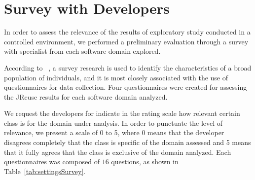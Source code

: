 \section{Survey with Developers}

In order to assess the relevance of the results of exploratory study conducted in a controlled environment, we performed a preliminary evaluation through a survey with specialist from each software domain explored.

According to ~\cite{Easterbrook2008}, a survey research is used to identify the characteristics of a broad population of individuals, and it is most closely associated with the use of questionnaires for data collection. Four questionnaires were created for assessing the JReuse results for each software domain analyzed. 


We request the developers for indicate in the rating scale how relevant certain class is for the domain under analysis. In order to punctuate the level of relevance, we present a scale of 0 to 5, where 0 means that the developer disagrees completely that the class is specific of the domain assessed and 5 means that it fully agrees that the class is exclusive of the domain analyzed. Each questionnaires was composed of $16$ questions, as shown in Table~\ref{tab:settingsSurvey}.





